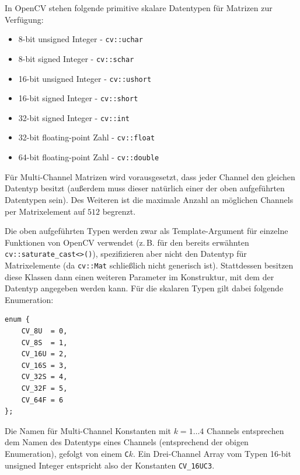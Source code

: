 \documentclass{whswinvcbook}
\begin{document}
In OpenCV stehen folgende primitive skalare Datentypen für Matrizen zur Verfügung:
\begin{itemize}
    \item 8-bit unsigned Integer - \texttt{cv::uchar}
    \item 8-bit signed Integer - \texttt{cv::schar}
    \item 16-bit unsigned Integer - \texttt{cv::ushort}
    \item 16-bit signed Integer - \texttt{cv::short}
    \item 32-bit signed Integer - \texttt{cv::int}
    \item 32-bit floating-point Zahl - \texttt{cv::float}
    \item 64-bit floating-point Zahl - \texttt{cv::double}
\end{itemize}
Für Multi-Channel Matrizen wird vorausgesetzt, dass jeder Channel den gleichen Datentyp besitzt (außerdem muss dieser natürlich einer der oben aufgeführten Datentypen sein). Des Weiteren ist die maximale Anzahl an möglichen Channels per Matrixelement auf $512$ begrenzt.

Die oben aufgeführten Typen werden zwar als Template-Argument für einzelne Funktionen von OpenCV verwendet (z.\,B. für den bereits erwähnten \texttt{cv::saturate\_cast<>()}), spezifizieren aber nicht den Datentyp für Matrixelemente (da \texttt{cv::Mat} schließlich nicht generisch ist). Stattdessen besitzen diese Klassen dann einen weiteren Parameter im Konstruktur, mit dem der Datentyp angegeben werden kann. Für die skalaren Typen gilt dabei folgende Enumeration:
\begin{lstlisting}[numbers=none,frame=none]
enum {
    CV_8U  = 0,
    CV_8S  = 1,
    CV_16U = 2,
    CV_16S = 3,
    CV_32S = 4,
    CV_32F = 5,
    CV_64F = 6
};
\end{lstlisting}
Die Namen für Multi-Channel Konstanten mit $k=1\dots4$ Channels entsprechen dem Namen des Datentyps eines Channels (entsprechend der obigen Enumeration), gefolgt von einem \texttt{C}$k$. Ein Drei-Channel Array vom Typen 16-bit unsigned Integer entspricht also der Konstanten \texttt{CV\_16UC3}.
\end{document}
